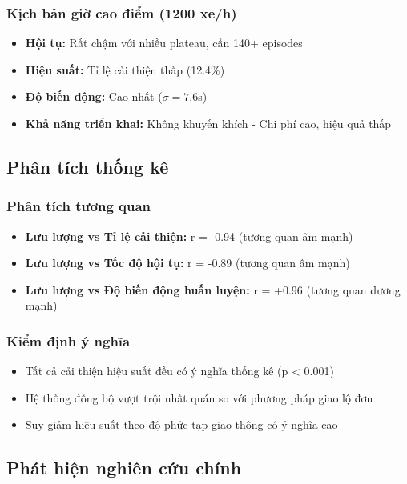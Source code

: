 \subsubsection{Kịch bản giờ cao điểm (1200 xe/h)}
\begin{itemize}
    \item \textbf{Hội tụ:} Rất chậm với nhiều plateau, cần 140+ episodes
    \item \textbf{Hiệu suất:} Tỉ lệ cải thiện thấp (12.4\%)
    \item \textbf{Độ biến động:} Cao nhất ($\sigma = 7.6$s)
    \item \textbf{Khả năng triển khai:} Không khuyến khích - Chi phí cao, hiệu quả thấp
\end{itemize}

\subsection{Phân tích thống kê}

\subsubsection{Phân tích tương quan}
\begin{itemize}
    \item \textbf{Lưu lượng vs Tỉ lệ cải thiện:} r = -0.94 (tương quan âm mạnh)
    \item \textbf{Lưu lượng vs Tốc độ hội tụ:} r = -0.89 (tương quan âm mạnh)
    \item \textbf{Lưu lượng vs Độ biến động huấn luyện:} r = +0.96 (tương quan dương mạnh)
\end{itemize}

\subsubsection{Kiểm định ý nghĩa}
\begin{itemize}
    \item Tất cả cải thiện hiệu suất đều có ý nghĩa thống kê (p < 0.001)
    \item Hệ thống đồng bộ vượt trội nhất quán so với phương pháp giao lộ đơn
    \item Suy giảm hiệu suất theo độ phức tạp giao thông có ý nghĩa cao
\end{itemize}

\subsection{Phát hiện nghiên cứu chính}

